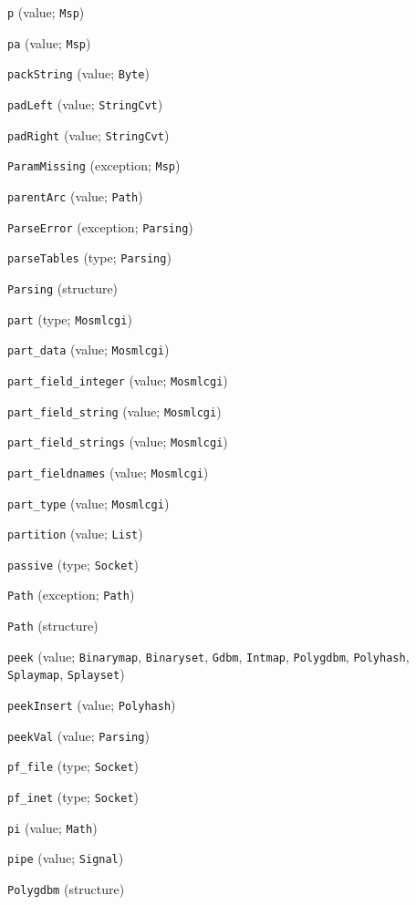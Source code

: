 \begin{description}
\item[] \verb"p" (value; \verb"Msp")
\item[] \verb"pa" (value; \verb"Msp")
\item[] \verb"packString" (value; \verb"Byte")
\item[] \verb"padLeft" (value; \verb"StringCvt")
\item[] \verb"padRight" (value; \verb"StringCvt")
\item[] \verb"ParamMissing" (exception; \verb"Msp")
\item[] \verb"parentArc" (value; \verb"Path")
\item[] \verb"ParseError" (exception; \verb"Parsing")
\item[] \verb"parseTables" (type; \verb"Parsing")
\item[] \verb"Parsing" (structure)
\item[] \verb"part" (type; \verb"Mosmlcgi")
\item[] \verb"part_data" (value; \verb"Mosmlcgi")
\item[] \verb"part_field_integer" (value; \verb"Mosmlcgi")
\item[] \verb"part_field_string" (value; \verb"Mosmlcgi")
\item[] \verb"part_field_strings" (value; \verb"Mosmlcgi")
\item[] \verb"part_fieldnames" (value; \verb"Mosmlcgi")
\item[] \verb"part_type" (value; \verb"Mosmlcgi")
\item[] \verb"partition" (value; \verb"List")
\item[] \verb"passive" (type; \verb"Socket")
\item[] \verb"Path" (exception; \verb"Path")
\item[] \verb"Path" (structure)
\item[] \verb"peek" (value; \verb"Binarymap", \verb"Binaryset", \verb"Gdbm", \verb"Intmap", \verb"Polygdbm", \verb"Polyhash", \verb"Splaymap", \verb"Splayset")
\item[] \verb"peekInsert" (value; \verb"Polyhash")
\item[] \verb"peekVal" (value; \verb"Parsing")
\item[] \verb"pf_file" (type; \verb"Socket")
\item[] \verb"pf_inet" (type; \verb"Socket")
\item[] \verb"pi" (value; \verb"Math")
\item[] \verb"pipe" (value; \verb"Signal")
\item[] \verb"Polygdbm" (structure)

\end{description}
